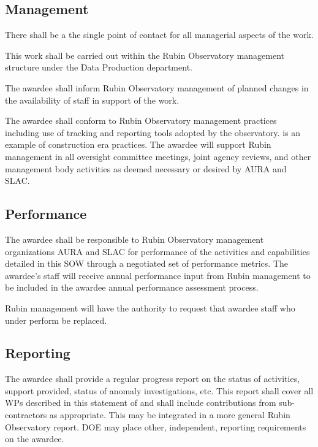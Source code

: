 \subsection{Management}\label{sec:manage}

\reqsimp{}{}{}{}{}
{
There  shall be  a the single point of contact for all managerial
aspects of the work. \label{req:spoc}
}

\reqsimp{}{}{}{}{}
{
  This work shall be carried out within the Rubin Observatory management structure under the Data Production
  department.
}

\reqsimp{}{}{}{}{}
{
The awardee shall inform Rubin Observatory management of planned changes in the
availability of staff in support of the work.
}

\reqsimp{}{}{}{}{}
{
The awardee shall conform to Rubin Observatory management practices
including use of tracking and reporting tools adopted by the observatory.
 is an example of construction era practices.
}
\reqsimp{}{}{}{}{}
{The awardee will support Rubin management in all oversight committee meetings, joint agency reviews, and other management body activities as deemed necessary or desired by AURA and SLAC. 
} 

\subsection{Performance}\label{sec:perf}
\reqsimp{}{}{}{}{}
{
The awardee shall be responsible to Rubin Observatory management organizations AURA and SLAC for performance of the activities and capabilities detailed in this
SOW through a negotiated set of performance metrics. 
}
\reqsimp{}{}{}{}{}
{
The awardee's staff will receive annual performance input from Rubin management to be included in the awardee annual performance assessment process.
}

\reqsimp{}{}{}{}{}
{
Rubin management will have the authority to request that awardee staff who under perform be replaced.
}

\subsection{Reporting}
\reqsimp{}{}{}{}{}
{
The awardee shall provide a regular progress report on the status of
activities, support provided, status of anomaly investigations, etc. This
report shall cover all WPs described in this statement of and shall include
contributions from sub-contractors as appropriate. This may be integrated in
a more general Rubin Observatory report. DOE may place other, independent,
reporting requirements on the awardee.
}

